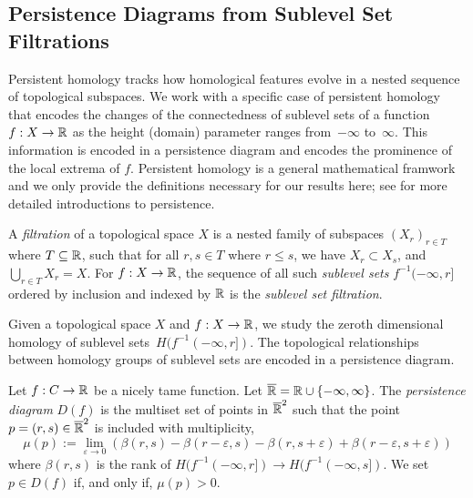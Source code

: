 \subsection{Persistence Diagrams from Sublevel Set Filtrations}

Persistent homology tracks how homological  features evolve in a nested sequence
of topological subspaces.  We work with a specific case of persistent homology that
encodes the changes of the connectedness of sublevel sets of a function~$f: X
\rightarrow \mathbb{R}$ as the height (domain) parameter ranges from~$-\infty$ to~$\infty$. This
information is encoded in a persistence diagram and encodes the prominence of
the local extrema of $f$. Persistent homology is a general mathematical framwork
and we only provide the definitions necessary for our results here;
see \cite{EdelsbrunnerComputational10,PereaA19} for more detailed
introductions to persistence.

A \emph{filtration} of a topological space $X$ is a nested family of subspaces
$(X_r)_{r\in T}$ where $T \subseteq \mathbb{R}$,
such that for all $r, s \in T$ where $r\leq s$, we have $X_r \subset X_s$, and $\bigcup_{r \in T} X_r = X$. For
$f: X\rightarrow \mathbb{R}$, the sequence of all such \emph{sublevel sets} $f^{-1}(-\infty, r]$ ordered by inclusion and indexed
by $\mathbb{R}$ is the \emph{sublevel set filtration}.

Given a topological space $X$ and $f: X\rightarrow \mathbb{R}$, we study the zeroth
dimensional homology of sublevel sets~$H(f^{-1}(-\infty, r])$. The topological
relationships between homology groups of sublevel sets are encoded in a
persistence diagram.

\begin{defn}\label{def:pd}
    Let $f: C\rightarrow \mathbb{R}$ be a nicely tame function. Let
    \mbox{$\overline{\mathbb{R}}=\mathbb{R} \cup \{-\infty, \infty\}$}. The \emph{persistence diagram}
    $D(f)$ is the multiset
    set of points in $\overline{\mathbb{R}}^2$ such that the point~$p = (r,
    s)\in\overline{\mathbb{R}}^2$ is included with multiplicity, 
    $$
        \mu(p) := \lim_{\varepsilon \to 0} \left( \beta(r,s) -
        \beta(r-\varepsilon,s)-\beta(r,s+\varepsilon)+\beta(r-\varepsilon,s+\varepsilon)
        \right) 
    $$
    where $\beta(r,s)$ is the
    rank of $H(f^{-1}(-\infty, r]) \to H(f^{-1}(-\infty, s])$. We set $p \in D(f)$ if, and only if, $\mu(p) >0$. 
    \end{defn}

